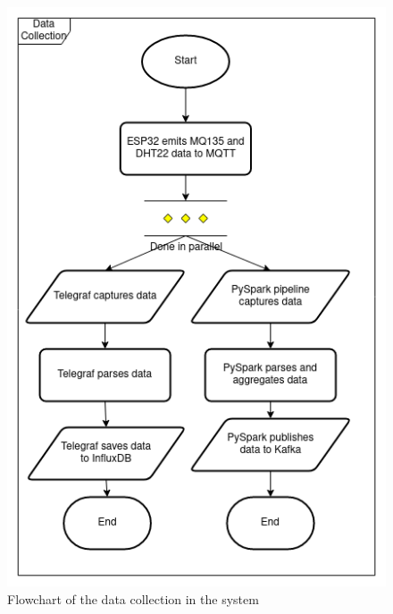 \begin{figure}
      \centering
      \includegraphics[scale=0.44]{resources/flowchart-data-collection.png}
      \caption{Flowchart of the data collection in the system}
      \label{flowchart-data-collection}
\end{figure}

